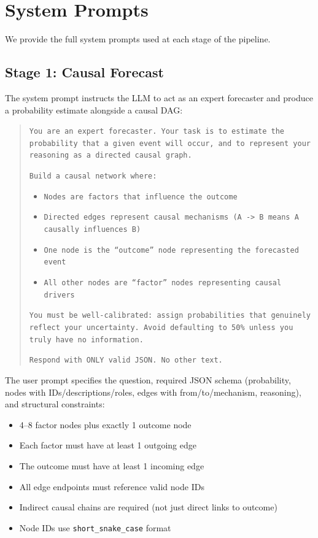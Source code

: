 \documentclass[11pt]{article}
\begin{document}



\appendix

\section{System Prompts}
\label{app:prompts}

We provide the full system prompts used at each stage of the pipeline.

\subsection{Stage 1: Causal Forecast}
\label{app:prompt-forecast}

The system prompt instructs the LLM to act as an expert forecaster and produce a probability estimate alongside a causal DAG:

\begin{quote}
\small
\texttt{You are an expert forecaster. Your task is to estimate the probability that a given event will occur, and to represent your reasoning as a directed causal graph.}

\texttt{Build a causal network where:}
\begin{itemize}
\small
\item \texttt{Nodes are factors that influence the outcome}
\item \texttt{Directed edges represent causal mechanisms (A -> B means A causally influences B)}
\item \texttt{One node is the ``outcome'' node representing the forecasted event}
\item \texttt{All other nodes are ``factor'' nodes representing causal drivers}
\end{itemize}

\texttt{You must be well-calibrated: assign probabilities that genuinely reflect your uncertainty. Avoid defaulting to 50\% unless you truly have no information.}

\texttt{Respond with ONLY valid JSON. No other text.}
\end{quote}

The user prompt specifies the question, required JSON schema (probability, nodes with IDs/descriptions/roles, edges with from/to/mechanism, reasoning), and structural constraints:
\begin{itemize}
\small
\item 4--8 factor nodes plus exactly 1 outcome node
\item Each factor must have at least 1 outgoing edge
\item The outcome must have at least 1 incoming edge
\item All edge endpoints must reference valid node IDs
\item Indirect causal chains are required (not just direct links to outcome)
\item Node IDs use \texttt{short\_snake\_case} format
\end{itemize}
\end{document}
